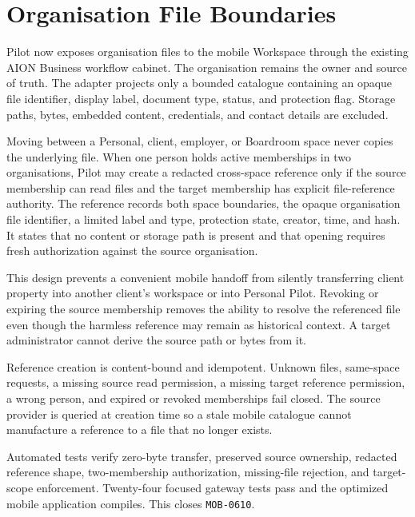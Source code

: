 \section{Organisation File Boundaries}
\label{sec:pilot-mobile-organisation-files}
\raggedright

Pilot now exposes organisation files to the mobile Workspace through the existing AION Business
workflow cabinet.  The organisation remains the owner and source of truth.  The adapter projects
only a bounded catalogue containing an opaque file identifier, display label, document type,
status, and protection flag.  Storage paths, bytes, embedded content, credentials, and contact
details are excluded.

Moving between a Personal, client, employer, or Boardroom space never copies the underlying file.
When one person holds active memberships in two organisations, Pilot may create a redacted
cross-space reference only if the source membership can read files and the target membership has
explicit file-reference authority.  The reference records both space boundaries, the opaque
organisation file identifier, a limited label and type, protection state, creator, time, and hash.
It states that no content or storage path is present and that opening requires fresh authorization
against the source organisation.

This design prevents a convenient mobile handoff from silently transferring client property into
another client's workspace or into Personal Pilot.  Revoking or expiring the source membership
removes the ability to resolve the referenced file even though the harmless reference may remain
as historical context.  A target administrator cannot derive the source path or bytes from it.

Reference creation is content-bound and idempotent.  Unknown files, same-space requests, a missing
source read permission, a missing target reference permission, a wrong person, and expired or
revoked memberships fail closed.  The source provider is queried at creation time so a stale
mobile catalogue cannot manufacture a reference to a file that no longer exists.

Automated tests verify zero-byte transfer, preserved source ownership, redacted reference shape,
two-membership authorization, missing-file rejection, and target-scope enforcement.  Twenty-four
focused gateway tests pass and the optimized mobile application compiles.  This closes
\texttt{MOB-0610}.

